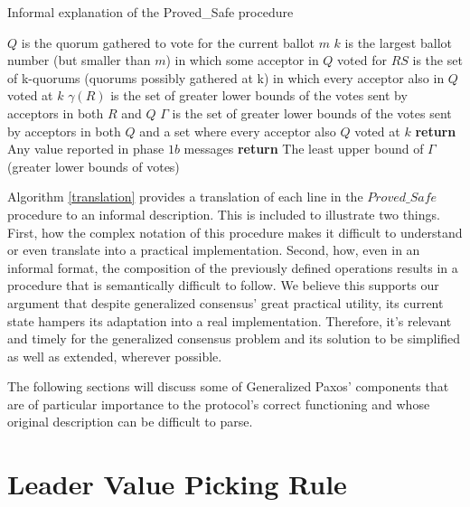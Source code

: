 \begin{algorithm}
	\caption{Informal explanation of the Proved\_Safe procedure}
	\label{translation}
	\begin{algorithmic}[1]
		\State $Q$ is the quorum gathered to vote for the current ballot $m$
		\State $k$ is the largest ballot number (but smaller than $m$) in which some acceptor in $Q$ voted for 
		\State $RS$ is the set of k-quorums (quorums possibly gathered at k) in which every acceptor also in $Q$ voted at $k$
		\State $\gamma(R)$ is the set of greater lower bounds of the votes sent by acceptors in both $R$ and $Q$
		\State $\Gamma$ is the set of greater lower bounds of the votes sent by acceptors in both $Q$ and a set where every acceptor also $Q$ voted at $k$
		\State \textbf{return} Any value reported in phase $1b$ messages
		\Else
		\State \textbf{return} The least upper bound of $\Gamma$ (greater lower bounds of votes)
		\EndIf
		\EndFunction
		
	\end{algorithmic}
\end{algorithm}

{\color{red}Algorithm \ref{translation} provides a translation of each line in the $Proved\_Safe$ procedure to an informal description. This is included to illustrate two things. First, how the complex notation of this procedure makes it difficult to understand or even translate into a practical implementation. Second, how, even in an informal format, the composition of the previously defined operations results in a procedure that is semantically difficult to follow. We believe this supports our argument that despite generalized consensus' great practical utility, its current state hampers its adaptation into a real implementation. Therefore, it's relevant and timely for the generalized consensus problem and its solution to be simplified as well as extended, wherever possible.\par
The following sections will discuss some of Generalized Paxos' components that are of particular importance to the protocol's correct functioning and whose original description can be difficult to parse.}

\section{Leader Value Picking Rule} \label{value_picking}

